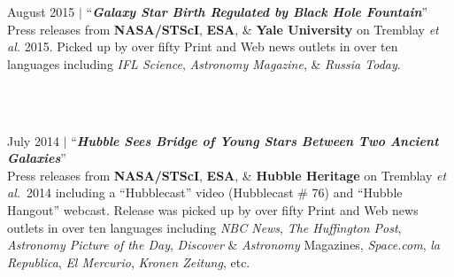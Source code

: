 \documentclass[11pt]{article}
\begin{document}
\hspace{42mm} \parbox{5.15in}{August 2015 $|$ ``\textit{\textbf{Galaxy Star Birth Regulated by Black Hole Fountain}}''\\
Press releases from \textbf{NASA/STScI}, \textbf{ESA}, \& \textbf{Yale University} on Tremblay \textit{et al.} 2015. Picked up by over fifty Print and Web news outlets in over ten languages including \textit{IFL Science}, \textit{Astronomy Magazine}, \& \textit{Russia Today}. }\\\\

\hspace{42mm} \parbox{5.15in}{July 2014 $|$ ``\textbf{\textit{Hubble Sees Bridge of Young Stars Between Two Ancient Galaxies}}''\\ Press releases from \textbf{NASA/STScI}, \textbf{ESA}, \& \textbf{Hubble Heritage} on Tremblay \textit{et al.}~2014 including a ``Hubblecast'' video (Hubblecast \# 76) and ``Hubble Hangout'' webcast. Release was picked up by over fifty Print and Web news outlets in over ten languages including \textit{NBC News}, \textit{The Huffington Post}, \textit{Astronomy Picture of the Day}, \textit{Discover} \& \textit{Astronomy} Magazines, \textit{Space.com}, \textit{la Republica}, \textit{El Mercurio}, \textit{Kronen Zeitung}, etc.}\\\\






\vspace{4mm}
\end{document}
